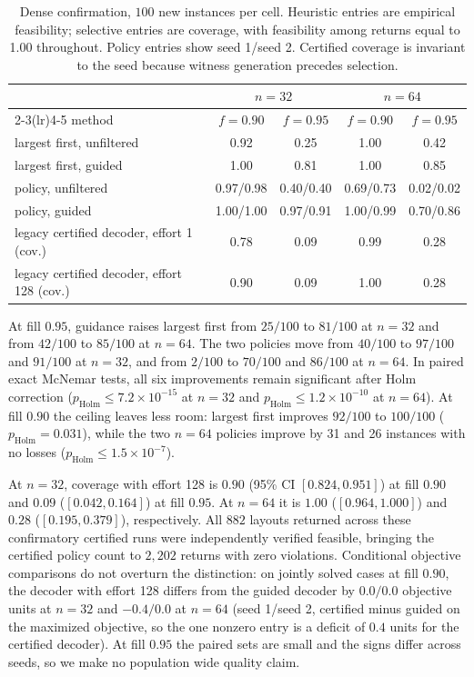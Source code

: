\documentclass[preprint,12pt,authoryear]{elsarticle}
\begin{document}
\begin{table}[t]
\centering
\caption{Dense confirmation, $100$ new instances per cell. Heuristic entries are
empirical feasibility; selective entries are coverage, with feasibility among
returns equal to 1.00 throughout. Policy entries show seed 1/seed 2. Certified
coverage is invariant to the seed because witness generation precedes selection.}
\label{tab:denseconfirm}
\footnotesize
\setlength{\tabcolsep}{2.5pt}
\begin{tabular}{@{}lcccc@{}}
\toprule
& \multicolumn{2}{c}{$n=32$} & \multicolumn{2}{c}{$n=64$} \\
\cmidrule(lr){2-3}\cmidrule(lr){4-5}
method & $f{=}0.90$ & $f{=}0.95$ & $f{=}0.90$ & $f{=}0.95$ \\
\midrule
largest first, unfiltered       & 0.92 & 0.25 & 1.00 & 0.42 \\
largest first, guided           & 1.00 & 0.81 & 1.00 & 0.85 \\
policy, unfiltered              & 0.97/0.98 & 0.40/0.40 & 0.69/0.73 & 0.02/0.02 \\
policy, guided                  & 1.00/1.00 & 0.97/0.91 & 1.00/0.99 & 0.70/0.86 \\
\midrule
legacy certified decoder, effort 1 (cov.)   & 0.78 & 0.09 & 0.99 & 0.28 \\
legacy certified decoder, effort 128 (cov.) & 0.90 & 0.09 & 1.00 & 0.28 \\
\bottomrule
\end{tabular}
\end{table}

At fill $0.95$, guidance raises largest first from $25/100$ to $81/100$ at
$n=32$ and from $42/100$ to $85/100$ at $n=64$. The two policies move from
$40/100$ to $97/100$ and $91/100$ at $n=32$, and from $2/100$ to $70/100$ and
$86/100$ at $n=64$. In paired exact McNemar tests, all six improvements remain
significant after Holm correction ($p_{\mathrm{Holm}}\le7.2\times10^{-15}$ at
$n=32$ and $p_{\mathrm{Holm}}\le1.2\times10^{-10}$ at $n=64$). At fill $0.90$
the ceiling leaves less room: largest first improves $92/100$ to $100/100$
($p_{\mathrm{Holm}}=0.031$), while the two $n=64$ policies improve by 31 and 26
instances with no losses ($p_{\mathrm{Holm}}\le1.5\times10^{-7}$).

At $n=32$, coverage with effort 128 is $0.90$ (95\% CI $[0.824,0.951]$) at
fill $0.90$ and $0.09$ ($[0.042,0.164]$) at fill $0.95$. At $n=64$ it is
$1.00$ ($[0.964,1.000]$) and $0.28$ ($[0.195,0.379]$), respectively. All $882$ layouts
returned across these confirmatory certified runs were independently verified
feasible, bringing the certified policy count to $2,202$ returns with zero
violations. Conditional objective comparisons do not overturn the distinction:
on jointly solved cases at fill $0.90$, the decoder with effort 128 differs from the
guided decoder by $0.0/0.0$ objective units at $n=32$ and $-0.4/0.0$ at $n=64$
(seed 1/seed 2, certified minus guided on the maximized objective, so the one
nonzero entry is a deficit of $0.4$ units for the certified decoder). At fill $0.95$
the paired sets are small and
the signs differ across seeds, so we make no population wide quality claim.
\end{document}
